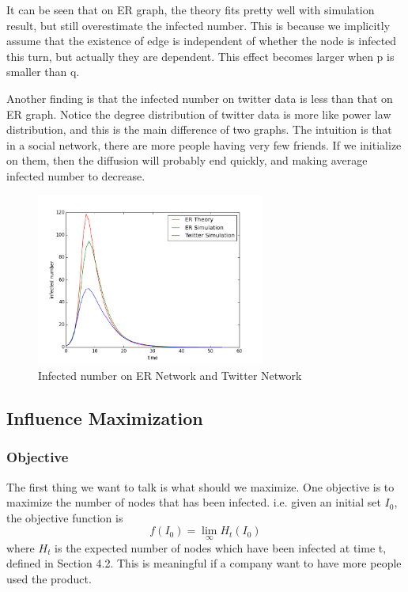 \documentclass{article}
\begin{document}
It can be seen that on ER graph, the theory fits pretty well with simulation result, but still overestimate the infected number. This is because we implicitly assume that the existence of edge is independent of whether the node is infected this turn, but actually they are dependent. This effect becomes larger when p is smaller than q.

Another finding is that the infected number on twitter data is less than that on ER graph. Notice the degree distribution of twitter data is more like power law distribution, and this is the main difference of two graphs. The intuition is that in a social network, there are more people having very few friends. If we initialize on them, then the diffusion will probably end quickly, and making average infected number to decrease.

\begin{figure}[H]
\centering
\includegraphics[width=7.5cm]{simple-plot.png}
\caption{Infected number on ER Network and Twitter Network}
\end{figure}

\subsection{Influence Maximization}
\subsubsection{Objective}
The first thing we want to talk is what should we maximize. One objective is to maximize the number of nodes that has been infected. i.e. given an initial set $I_0$, the objective function is 
\begin{equation}
f(I_0)=\lim_{\infty}H_t(I_0)
\end{equation}
where $H_t$ is the expected number of nodes which have been infected at time t, defined in Section 4.2. This is meaningful if a company want to have more people used the product. 
\end{document}
